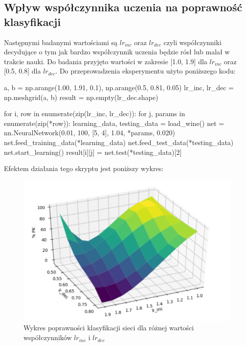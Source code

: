 \documentclass[a4paper,12pt]{article}
\numberwithin{equation}{section}
\begin{document}
\subsection{Wpływ współczynnika uczenia na poprawność klasyfikacji}

Następnymi badanymi wartościami są $lr_{inc}$ oraz $lr_{dec}$ czyli współczynniki decydujące o tym jak bardzo współczynnik uczenia będzie rósł lub malał w trakcie nauki. Do badania przyjęto wartości w zakresie [1.0, 1.9] dla $lr_{inc}$ oraz [0.5, 0.8] dla $lr_{dec}$. Do przeprowadzenia eksperymentu użyto poniższego kodu:

\begin{pythoncode}
a, b = np.arange(1.00, 1.91, 0.1), np.arange(0.5, 0.81, 0.05)
lr_inc, lr_dec = np.meshgrid(a, b)
result = np.empty(lr_dec.shape)

for i, row in enumerate(zip(lr_inc, lr_dec)):
    for j, params in enumerate(zip(*row)):
        learning_data, testing_data = load_wine()
        net = nn.NeuralNetwork(0.01, 100, [5, 4], 1.04, *params, 0.020)
        net.feed_training_data(*learning_data)
        net.feed_test_data(*testing_data)
        net.start_learning()
        result[i][j] = net.test(*testing_data)[2]
\end{pythoncode}

\noindent Efektem działania tego skryptu jest poniższy wykres:

\begin{figure}[h]
    \centering
    \includegraphics[width=\textwidth]{exp_4.png}
    \caption{Wykres poprawności klasyfikacji sieci dla różnej wartości współczynników $lr_{inc}$ i $lr_{dec}$}
    \label{fig:exp_4}
\end{figure}
\end{document}
